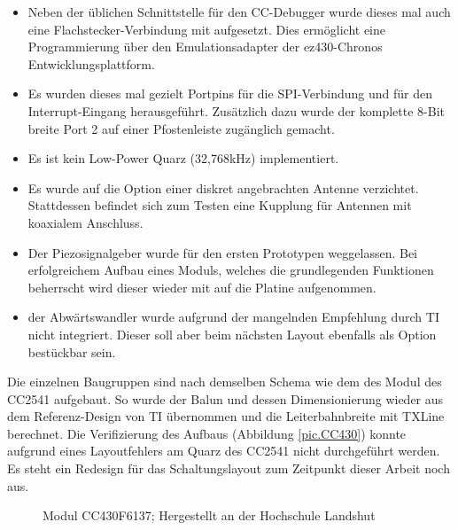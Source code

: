 \documentclass[12pt]{scrreprt} %
\begin{document}
\begin{itemize}
\item
Neben der üblichen Schnittstelle für den CC-Debugger wurde dieses mal auch eine Flachstecker-Verbindung mit aufgesetzt. Dies ermöglicht eine Programmierung über den Emulationsadapter der ez430-Chronos Entwicklungsplattform.
\item
Es wurden dieses mal gezielt Portpins für die SPI-Verbindung und für den Interrupt-Eingang herausgeführt. Zusätzlich dazu wurde der komplette 8-Bit breite Port 2 auf einer Pfostenleiste zugänglich gemacht.
\item
Es ist kein Low-Power Quarz (32,768kHz) implementiert.
\item
Es wurde auf die Option einer diskret angebrachten Antenne verzichtet. Stattdessen befindet sich zum Testen eine Kupplung für Antennen mit koaxialem Anschluss.
\item
Der Piezosignalgeber wurde für den ersten Prototypen weggelassen. Bei erfolgreichem Aufbau eines Moduls, welches die grundlegenden Funktionen beherrscht wird dieser wieder mit auf die Platine aufgenommen.
\item
der Abwärtswandler wurde aufgrund der mangelnden Empfehlung durch TI nicht integriert. Dieser soll aber beim nächsten Layout ebenfalls als Option bestückbar sein.
\end{itemize}
Die einzelnen Baugruppen sind nach demselben Schema wie dem des Modul des CC2541 aufgebaut. So wurde der Balun und dessen Dimensionierung wieder aus dem Referenz-Design von TI übernommen und die Leiterbahnbreite mit TXLine berechnet. 
Die Verifizierung des Aufbaus (Abbildung \vref{pic.CC430}) konnte aufgrund eines Layoutfehlers am Quarz des CC2541 nicht durchgeführt werden. Es steht ein Redesign für das Schaltungslayout zum Zeitpunkt dieser Arbeit noch aus. 
\begin{figure}
\centering
{}
\caption{Modul CC430F6137; Hergestellt an der Hochschule Landshut}
\label{pic.CC430}
\end{figure}
\end{document}
